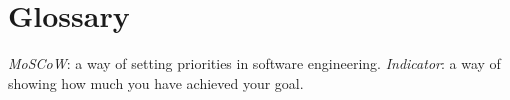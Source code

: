 \section{Glossary}

\textit{MoSCoW}: a way of setting priorities in software engineering. \newline
\textit{Indicator}: a way of showing how much you have achieved your goal. 